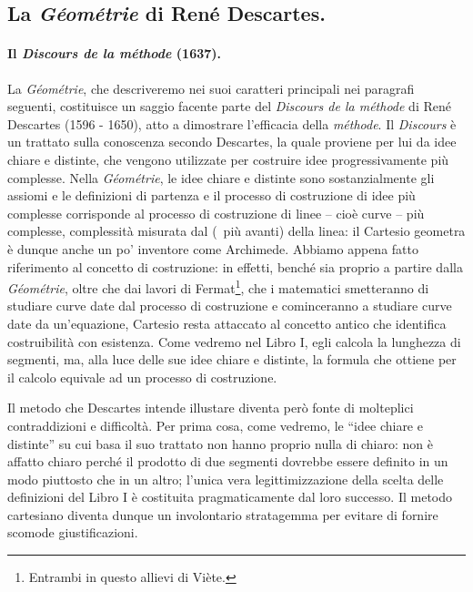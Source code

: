 \subsection{La \textit{G\'eom\'etrie} di Ren\'e Descartes.}\label{LaGeometrieDiReneDescartes}
\paragraph{Il \textit{Discours de la m\'ethode} (1637).} La \textit{G\'eom\'etrie}, che descriveremo nei suoi caratteri principali nei paragrafi seguenti, costituisce un saggio facente parte del \textit{Discours de la m\'ethode} di Ren\'e Descartes (1596 - 1650), atto a dimostrare l'efficacia della \textit{m\'ethode}. Il \textit{Discours}  \`e un trattato sulla conoscenza secondo Descartes, la quale proviene per lui da idee chiare e distinte, che vengono utilizzate per costruire idee progressivamente pi\`u complesse. Nella \textit{G\'eom\'etrie}, le idee chiare e distinte sono sostanzialmente gli assiomi e le definizioni di partenza e il processo di costruzione di idee pi\`u complesse corrisponde al processo di costruzione di linee -- cio\`e curve -- pi\`u complesse, complessit\`a misurata dal  (\Cfr\ pi\`u avanti) della linea: il Cartesio geometra \`e dunque anche un po' inventore come Archimede. Abbiamo appena fatto riferimento al concetto di costruzione: in effetti, bench\'e sia proprio a partire dalla \textit{G\'eom\'etrie}, oltre che dai lavori di Fermat\footnote{Entrambi in questo allievi di Vi\`ete.}, che i matematici smetteranno di studiare curve date dal processo di costruzione e cominceranno a studiare curve date da un'equazione, Cartesio resta attaccato al concetto antico che identifica costruibilit\`a con esistenza. Come vedremo nel Libro I, egli calcola la lunghezza di segmenti, ma, alla luce delle sue idee chiare e distinte, la formula che ottiene per il calcolo equivale ad un processo di costruzione.
\par Il metodo che Descartes intende illustare diventa per\`o fonte di molteplici contraddizioni e difficolt\`a. Per prima cosa, come vedremo, le ``idee chiare e distinte'' su cui basa il suo trattato non hanno proprio nulla di chiaro: non \`e affatto chiaro perch\'e il prodotto di due segmenti dovrebbe essere definito in un modo piuttosto che in un altro; l'unica vera legittimizzazione della scelta delle definizioni del Libro I \`e costituita pragmaticamente dal loro successo. Il metodo cartesiano diventa dunque un involontario stratagemma per evitare di fornire scomode giustificazioni.

